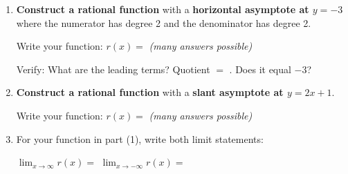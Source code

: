 \documentclass[10pt]{article}
\begin{document}
\begin{tcolorbox}[colback=white, colframe=black!40,
    title=\textbf{Tier E --- Extend},
    fonttitle=\bfseries, arc=2mm, left=3mm, right=3mm, top=2mm, bottom=2mm]

\begin{enumerate}[itemsep=10pt]
  \item \textbf{Construct a rational function} with a \textbf{horizontal asymptote at $y = -3$}
        where the numerator has degree 2 and the denominator has degree 2.

        Write your function: $r(x) = $  \textit{(many answers possible)}

        Verify: What are the leading terms?  Quotient $=$ . Does it equal $-3$? 

  \item \textbf{Construct a rational function} with a \textbf{slant asymptote at $y = 2x + 1$}.

        Write your function: $r(x) = $  \textit{(many answers possible)}


  \item For your function in part (1), write both limit statements:

        $\displaystyle\lim_{x\to\infty} r(x) = $ 
        \qquad
        $\displaystyle\lim_{x\to -\infty} r(x) = $ 
\end{enumerate}
\end{tcolorbox}
\end{document}
